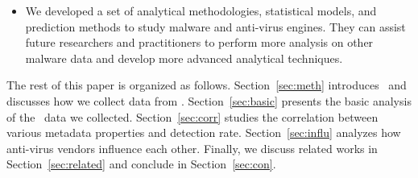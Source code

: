 \begin{itemize}
\item
We developed a set of analytical methodologies, statistical models, and prediction methods to study malware and anti-virus engines.
They can assist future researchers and practitioners to perform more analysis on other malware data and develop more advanced analytical techniques.

\end{itemize}

The rest of this paper is organized as follows.
Section~\ref{sec:meth} introduces \vt\ and discusses how we collect data from \vt. 
Section~\ref{sec:basic} presents the basic analysis of the \vt\ data we collected. 
Section~\ref{sec:corr} studies the correlation between various metadata properties and detection rate. 
Section~\ref{sec:influ} analyzes how anti-virus vendors influence each other.
Finally, we discuss related works in Section~\ref{sec:related} and conclude in Section~\ref{sec:con}.